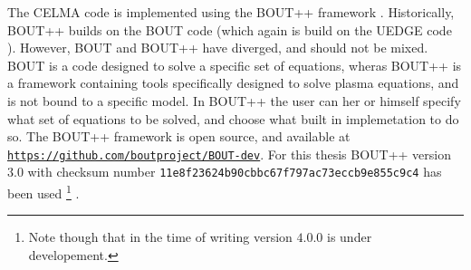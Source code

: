 The CELMA code is implemented using the BOUT++ framework \cite{Dudson2009,Dudson2014a,Dudson2016}.
Historically, BOUT++ builds on the BOUT code \cite{Xu1998} (which again is build on the UEDGE code \cite{Rognlien1996}).
However, BOUT and BOUT++ have diverged, and should not be mixed.
BOUT is a code designed to solve a specific set of equations, wheras BOUT++ is a framework containing tools specifically designed to solve plasma equations, and is not bound to a specific model.
In BOUT++ the user can her or himself specify what set of equations to be solved, and choose what built in implemetation to do so.
The BOUT++ framework is open source, and available at \href{https://github.com/boutproject/BOUT-dev}{\texttt{https://github.com/boutproject/BOUT-dev}}.
For this thesis BOUT++ version $3.0$ with checksum number \texttt{11e8f23624b90cbbc67f797ac73eccb9e855c9c4} has been used%
%
\footnote{Note though that in the time of writing version $4.0.0$ is under developement.}%
%
.
